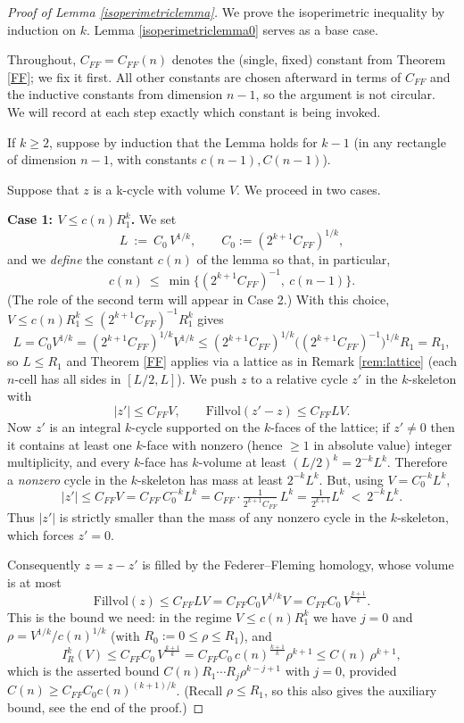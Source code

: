 \documentclass{amsart}
\newtheorem*{theorem 1}{Theorem 1}
\newtheorem*{theorem 2}{Theorem 2}
\newtheorem*{theorem 3}{Theorem 3}
\numberwithin{equation}{section}
\begin{document}
\begin{proof} [Proof of Lemma \ref{isoperimetriclemma}]

We prove the isoperimetric inequality by
induction on $k$.    Lemma \ref{isoperimetriclemma0} serves as a base case.

Throughout, $C_{FF} = C_{FF}(n)$ denotes the (single, fixed)
constant from Theorem \ref{FF}; we fix it first.  All other
constants are chosen afterward in terms of $C_{FF}$ and the
inductive constants from dimension $n-1$, so the argument is not
circular.  We will record at each step exactly which constant is
being invoked.

If $k \ge 2$,  suppose by induction that the Lemma holds for $k-1$
(in any rectangle of dimension $n-1$, with constants
$c(n-1),C(n-1)$).

Suppose that $z$ is a k-cycle
with volume $V$.  We proceed in two cases.

\medskip
\noindent\textbf{Case 1: $V \le c(n) R_1^k$.}
We set
$$ L \ :=\ C_0\, V^{1/k}, \qquad C_0 := (2^{k+1} C_{FF})^{1/k}, $$
and we \emph{define} the constant $c(n)$ of the lemma so that, in
particular,
\begin{equation} \label{cn-choice}
 c(n) \ \le\ \min\Big\{ (2^{k+1} C_{FF})^{-1},\ c(n-1)\Big\}.
\end{equation}
(The role of the second term will appear in Case 2.)  With this
choice, $V \le c(n) R_1^k \le (2^{k+1} C_{FF})^{-1} R_1^k$ gives
$$ L = C_0 V^{1/k} = (2^{k+1} C_{FF})^{1/k} V^{1/k}
   \le (2^{k+1} C_{FF})^{1/k}\big((2^{k+1}C_{FF})^{-1}\big)^{1/k} R_1
   = R_1, $$
so $L \le R_1$ and Theorem \ref{FF} applies via a lattice as in
Remark \ref{rem:lattice} (each $n$-cell has all sides in
$[L/2,L]$).  We push $z$ to a relative cycle $z'$ in the
$k$-skeleton with
$$ |z'| \le C_{FF} V, \qquad \mathrm{Fillvol}(z'-z) \le C_{FF} L V. $$
Now $z'$ is an integral $k$-cycle supported on the $k$-faces of
the lattice; if $z' \neq 0$ then it contains at least one $k$-face
with nonzero (hence $\ge 1$ in absolute value) integer
multiplicity, and every $k$-face has $k$-volume at least
$(L/2)^k = 2^{-k} L^k$.  Therefore a \emph{nonzero} cycle in the
$k$-skeleton has mass at least $2^{-k} L^k$.  But, using $V = C_0^{-k} L^k$,
$$ |z'| \le C_{FF} V = C_{FF}\, C_0^{-k} L^k
     = C_{FF}\cdot \tfrac{1}{2^{k+1} C_{FF}}\, L^k
     = \tfrac{1}{2^{k+1}} L^k \ <\ 2^{-k} L^k. $$
Thus $|z'|$ is strictly smaller than the mass of any nonzero cycle
in the $k$-skeleton, which forces $z' = 0$.

Consequently $z = z - z'$ is filled by the Federer--Fleming
homology, whose volume is at most
$$ \mathrm{Fillvol}(z) \le C_{FF} L V = C_{FF} C_0 V^{1/k} V
   = C_{FF} C_0\, V^{\frac{k+1}{k}}. $$
This is the bound we need: in the regime $V \le c(n) R_1^k$ we have
$j = 0$ and $\rho = V^{1/k}/c(n)^{1/k}$ (with $R_0 := 0 \le
\rho \le R_1$), and
$$ I_R^k(V) \le C_{FF} C_0\, V^{\frac{k+1}{k}}
   = C_{FF} C_0\, c(n)^{\frac{k+1}{k}} \rho^{k+1}
   \le C(n)\, \rho^{k+1}, $$
which is the asserted bound $C(n) R_1 \cdots R_j \rho^{k-j+1}$ with
$j=0$, provided $C(n) \ge C_{FF} C_0 c(n)^{(k+1)/k}$.  (Recall
$\rho \le R_1$, so this also gives the auxiliary bound, see the
end of the proof.)


\end{proof}
\end{document}
